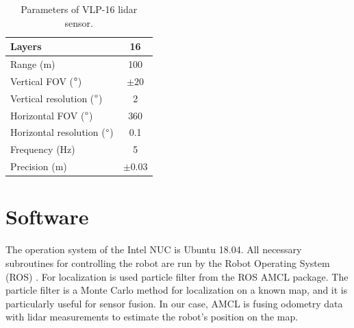 \begin{table}[H]
\centering
\begin{tabular}{|l|c|}
\hline
Layers                            & 16   \\ \hline
Range (m)                         & 100  \\ \hline
Vertical FOV ($\degree$)          & $\pm20$   \\ \hline
Vertical resolution ($\degree$)   & 2    \\ \hline
Horizontal FOV ($\degree$)        & 360  \\ \hline
Horizontal resolution ($\degree$) & 0.1  \\ \hline
Frequency (Hz)                    & 5    \\ \hline
Precision (m)                     & $\pm0.03$ \\ \hline
\end{tabular}
\caption{Parameters of VLP-16 lidar sensor.}
\label{tab:lidar}
\end{table}

\section{Software}
The operation system of the Intel NUC is Ubuntu 18.04. All necessary subroutines for controlling the robot are run by the Robot Operating System (ROS) \cite{ros}. For localization is used particle filter from the ROS AMCL package. The particle filter is a Monte Carlo method for localization on a known map, and it is particularly useful for sensor fusion. In our case, AMCL is fusing odometry data with lidar measurements to estimate the robot's position on the map.

\newpage